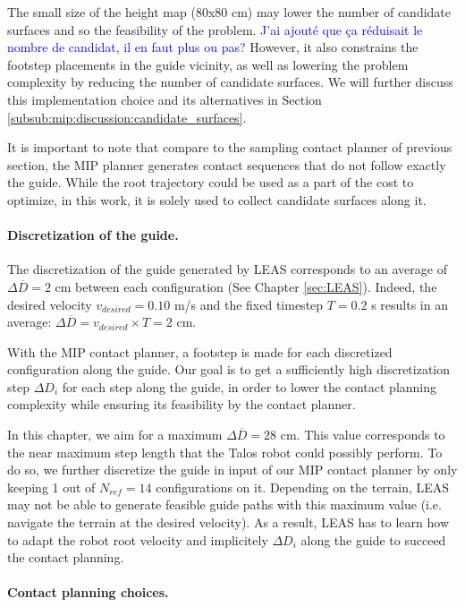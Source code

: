 The small size of the height map (80x80 cm) may lower the number of candidate surfaces and so the feasibility of the problem. 
 \textcolor{blue}{J'ai ajouté que ça réduisait le nombre de candidat, il en faut plus ou pas?}
However, it also constrains the footstep placements in the guide vicinity, as well as lowering the problem complexity by reducing the number of candidate surfaces.
We will further discuss this implementation choice and its alternatives in Section \ref{subsub:mip:discussion:candidate_surfaces}.

It is important to note that compare to the sampling contact planner of previous section, the MIP planner generates contact sequences that do not follow exactly the guide.
While the root trajectory could be used as a part of the cost to optimize, in this work, it is solely used to collect candidate surfaces along it.


\paragraph{Discretization of the guide.}
The discretization of the guide generated by LEAS corresponds to an average of $\Delta \overline{D}=2$ cm between each configuration (See Chapter \ref{sec:LEAS}). Indeed, the desired velocity $v_{desired}=0.10$ m/s and the fixed timestep $T=0.2$ s results in an average: $\Delta \overline{D} = v_{desired} \times T = 2$ cm.

With the MIP contact planner, a footstep is made for each discretized configuration along the guide.
Our goal is to get a sufficiently high discretization step $\Delta D_i$ for each step along the guide, in order to lower the contact planning complexity while ensuring its feasibility by the contact planner.

In this chapter, we aim for a maximum $\Delta \overline{D} =28$ cm. 
This value corresponds to the near maximum step length that the Talos robot could possibly perform.
To do so, we further discretize the guide in input of our MIP contact planner by only keeping 1 out of $N_{ref}=14$ configurations on it.
Depending on the terrain, LEAS may not be able to generate feasible guide paths with this maximum value (i.e. navigate the terrain at the desired velocity).
As a result, LEAS has to learn how to adapt the robot root velocity and implicitely $\Delta D_i$ along the guide to succeed the contact planning.


\paragraph{Contact planning choices.}

